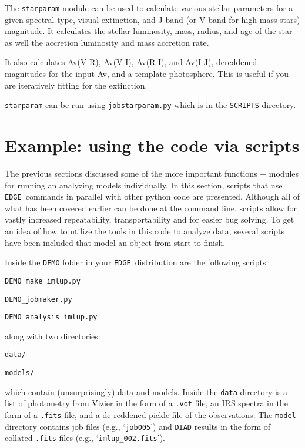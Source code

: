 \documentclass{article}
\newcommand{\edge}{\texttt{EDGE }}
\begin{document}
The \texttt{starparam} module can be used to calculate various stellar parameters for a given spectral type, visual extinction, and J-band (or V-band for high mass stars) magnitude.  It calculates the stellar luminosity, mass, radius, and age of the star as well the accretion luminosity and mass accretion rate.

It also calculates Av(V-R), Av(V-I), Av(R-I), and Av(I-J), dereddened magnitudes for the input Av, and a template photosphere. This is useful if you are iteratively fitting for the extinction. 

\texttt{starparam} can be run using \texttt{jobstarparam.py} which is in the \texttt{SCRIPTS} directory.

\section{Example: using the code via scripts} \label{scripts}

The previous sections discussed some of the more important functions + modules for running an analyzing models individually. In this section, scripts that use \edge commands in parallel with other python code are presented. Although all of what has been covered earlier can be done at the command line, scripts allow for vastly increased repeatability, transportability and for easier bug solving. To get an idea of how to utilize the tools in this code to analyze data, several scripts have been included that model an object from start to finish.

\noindent Inside the \texttt{DEMO} folder in your \edge distribution are the following scripts:

\vspace{2mm}
\texttt{DEMO\_make\_imlup.py}

\texttt{DEMO\_jobmaker.py}

\texttt{DEMO\_analysis\_imlup.py}
\vspace{2mm}

\noindent along with two directories:

\vspace{2mm}
\texttt{data/}

\texttt{models/}
\vspace{2mm}

\noindent which contain (unsurprisingly) data and models. Inside the \texttt{data} directory is a list of photometry from Vizier in the form of a \texttt{.vot} file,  an IRS spectra in the form of a \texttt{.fits} file, and a de-reddened pickle file of the observations. The \texttt{model} directory contains job files (e.g., `\texttt{job005}') and \texttt{DIAD} results in the form of collated \texttt{.fits} files (e.g., `\texttt{imlup\_002.fits}').
\end{document}

